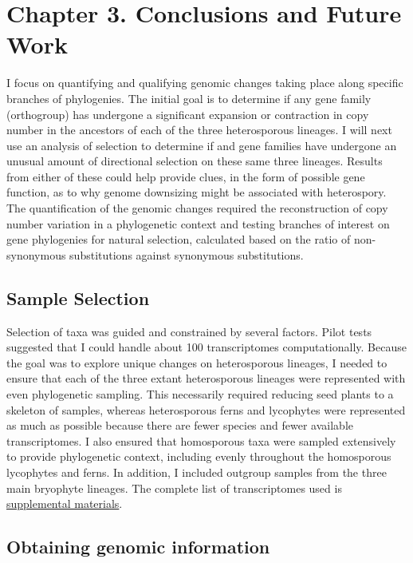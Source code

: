 \chapter{Chapter 3. Conclusions and Future Work}

I focus on quantifying and qualifying genomic changes taking place along specific branches of phylogenies. The initial goal is to determine if any gene family (orthogroup) has undergone a significant expansion or contraction in copy number in the ancestors of each of the three heterosporous lineages. I will next use an analysis of selection to determine if and gene families have undergone an unusual amount of directional selection on these same three lineages.  Results from either of these could help provide clues, in the form of possible gene function, as to why genome downsizing might be associated with heterospory. The quantification of the genomic changes required the reconstruction of copy number variation in a phylogenetic context and testing branches of interest on gene phylogenies for natural selection, calculated based on the ratio of non-synonymous substitutions against synonymous substitutions.

\section{Sample Selection}

Selection of taxa was guided and constrained by several factors. Pilot tests suggested that I could handle about 100 transcriptomes computationally. Because the goal was to explore unique changes on heterosporous lineages, I needed to ensure that each of the three extant heterosporous lineages were represented with even phylogenetic sampling. This necessarily required reducing seed plants to a skeleton of samples, whereas heterosporous ferns and lycophytes were represented as much as possible because there are fewer species and fewer available transcriptomes. I also ensured that homosporous taxa were sampled extensively to provide phylogenetic context, including evenly throughout the homosporous lycophytes and ferns. In addition, I included outgroup samples from the three main bryophyte lineages. The complete list of transcriptomes used is \href{https://uah0-my.sharepoint.com/:x:/g/personal/rrd0009_uah_edu/ERrv2rtJLe9EqJFMda1X7TQBX8BZpV3mMbJMVwOvgfyrFw?e=kD5W1O}{supplemental materials}.

\section{Obtaining genomic information}

